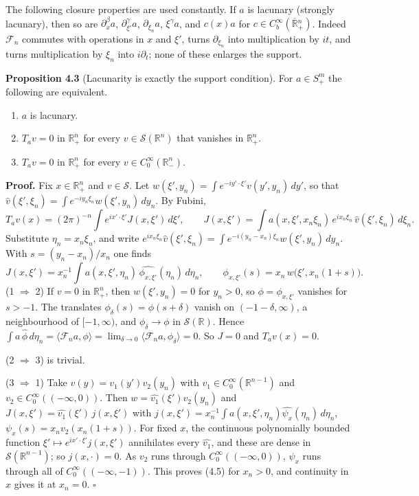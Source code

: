 \documentclass[
  11pt,
]{article}
\providecommand{\tightlist}{%
  \setlength{\itemsep}{0pt}\setlength{\parskip}{0pt}}
\begin{document}
The following closure properties are used constantly. If \(a\) is
lacunary (strongly lacunary), then so are \(\partial_x^\beta a\),
\(\partial_{\xi'}^\gamma a\), \(\partial_{\xi_n}a\), \(\xi^\gamma a\),
and \(c(x)a\) for \(c\in C^\infty_b(\overline{\mathbb R}{}^n_+)\).
Indeed \(\mathcal F_n\) commutes with operations in \(x\) and \(\xi'\),
turns \(\partial_{\xi_n}\) into multiplication by \(it\), and turns
multiplication by \(\xi_n\) into \(i\partial_t\); none of these enlarges
the support.

\textbf{Proposition 4.3} (Lacunarity is exactly the support condition).
For \(a\in S^m_+\) the following are equivalent.

\begin{enumerate}
\def\labelenumi{\arabic{enumi}.}
\tightlist
\item
  \(a\) is lacunary.
\item
  \(T_av=0\) in \(\mathbb R^n_+\) for every
  \(v\in\mathcal S(\mathbb R^n)\) that vanishes in \(\mathbb R^n_+\).
\item
  \(T_av=0\) in \(\mathbb R^n_+\) for every
  \(v\in C_0^\infty(\mathbb R^n_-)\).
\end{enumerate}

\textbf{Proof.} Fix \(x\in\mathbb R^n_+\) and \(v\in\mathcal S\). Let
\(w(\xi',y_n)=\int e^{-iy'\cdot\xi'}v(y',y_n)\,dy'\), so that
\(\widehat v(\xi',\xi_n)=\int e^{-iy_n\xi_n}w(\xi',y_n)\,dy_n\). By
Fubini, \[
T_av(x)=(2\pi)^{-n}\int e^{ix'\cdot\xi'}J(x,\xi')\,d\xi',\qquad
J(x,\xi')=\int a(x,\xi',x_n\xi_n)\,e^{ix_n\xi_n}\,\widehat v(\xi',\xi_n)\,d\xi_n .
\] Substitute \(\eta_n=x_n\xi_n\), and write
\(e^{ix_n\xi_n}\widehat v(\xi',\xi_n)=\int e^{-i(y_n-x_n)\xi_n}w(\xi',y_n)\,dy_n\).
With \(s=(y_n-x_n)/x_n\) one finds \[
J(x,\xi')=x_n^{-1}\int a(x,\xi',\eta_n)\,\widehat{\phi_{x,\xi'}}(\eta_n)\,d\eta_n,\qquad \phi_{x,\xi'}(s)=x_n\,w\big(\xi',x_n(1+s)\big).
\tag{4.6}
\] (1 \(\Rightarrow\) 2) If \(v=0\) in \(\mathbb R^n_+\), then
\(w(\xi',y_n)=0\) for \(y_n>0\), so \(\phi=\phi_{x,\xi'}\) vanishes for
\(s>-1\). The translates \(\phi_\delta(s)=\phi(s+\delta)\) vanish on
\((-1-\delta,\infty)\), a neighbourhood of \([-1,\infty)\), and
\(\phi_\delta\to\phi\) in \(\mathcal S(\mathbb R)\). Hence
\(\int a\,\widehat\phi\,d\eta_n=\langle\mathcal F_na,\phi\rangle=\lim_{\delta\to0}\langle\mathcal F_na,\phi_\delta\rangle=0\).
So \(J=0\) and \(T_av(x)=0\).

(2 \(\Rightarrow\) 3) is trivial.

(3 \(\Rightarrow\) 1) Take \(v(y)=v_1(y')v_2(y_n)\) with
\(v_1\in C_0^\infty(\mathbb R^{n-1})\) and
\(v_2\in C_0^\infty((-\infty,0))\). Then
\(w=\widehat{v_1}(\xi')v_2(y_n)\) and
\(J(x,\xi')=\widehat{v_1}(\xi')\,j(x,\xi')\) with
\(j(x,\xi')=x_n^{-1}\int a(x,\xi',\eta_n)\widehat{\psi_x}(\eta_n)\,d\eta_n\),
\(\psi_x(s)=x_nv_2(x_n(1+s))\). For fixed \(x\), the continuous
polynomially bounded function \(\xi'\mapsto e^{ix'\cdot\xi'}j(x,\xi')\)
annihilates every \(\widehat{v_1}\), and these are dense in
\(\mathcal S(\mathbb R^{n-1})\); so \(j(x,\cdot)=0\). As \(v_2\) runs
through \(C_0^\infty((-\infty,0))\), \(\psi_x\) runs through all of
\(C_0^\infty((-\infty,-1))\). This proves (4.5) for \(x_n>0\), and
continuity in \(x\) gives it at \(x_n=0\). \(\square\)
\end{document}
